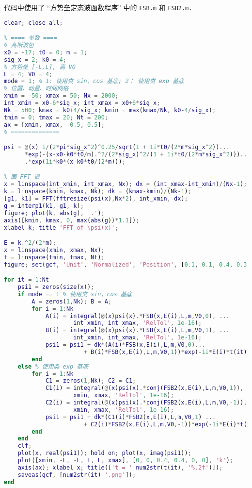 代码中使用了 “方势垒定态波函数程序” 中的 \verb|FSB.m| 和 \verb|FSB2.m|．
\begin{lstlisting}[language=matlab, caption=FSBsct.m]
% 方势垒散射高斯波包
clear; close all;

% ==== 参数 ====
% 高斯波包
x0 = -17; t0 = 0; m = 1;
sig_x = 2; k0 = 4;
% 方势垒 [-L,L], 高 V0
L = 4; V0 = 4;
mode = 1; % 1: 使用类 sin，cos 基底; 2： 使用类 exp 基底
% 位置、动量、时间网格
xmin = -50; xmax = 50; Nx = 2000;
int_xmin = x0-6*sig_x; int_xmax = x0+6*sig_x;
Nk = 500; kmax = k0+4/sig_x; kmin = max(kmax/Nk, k0-4/sig_x);
tmin = 0; tmax = 20; Nt = 200;
ax = [xmin, xmax, -0.5, 0.5];
% ==============

psi = @(x) 1/(2*pi*sig_x^2)^0.25/sqrt(1 + 1i*t0/(2*m*sig_x^2))...
      *exp(-(x-x0-k0*t0/m).^2/(2*sig_x)^2/(1 + 1i*t0/(2*m*sig_x^2)))...
      .*exp(1i*k0*(x-k0*t0/(2*m)));

% 画 FFT 谱
x = linspace(int_xmin, int_xmax, Nx); dx = (int_xmax-int_xmin)/(Nx-1);
k = linspace(kmin, kmax, Nk); dk = (kmax-kmin)/(Nk-1);
[g1, k1] = FFT(fftresize(psi(x),Nx*2), int_xmin, dx);
g = interp1(k1, g1, k);
figure; plot(k, abs(g), '.');
axis([kmin, kmax, 0, max(abs(g))*1.1]);
xlabel k; title 'FFT of \psi(x)';

E = k.^2/(2*m);
x = linspace(xmin, xmax, Nx);
t = linspace(tmin, tmax, Nt);
figure; set(gcf, 'Unit', 'Normalized', 'Position', [0.1, 0.1, 0.4, 0.3]);

for it = 1:Nt
    psi1 = zeros(size(x));
    if mode == 1 % 使用类 sin，cos 基底
        A = zeros(1,Nk); B = A;
        for i = 1:Nk
            A(i) = integral(@(x)psi(x).*FSB(x,E(i),L,m,V0,0), ...
                    int_xmin, int_xmax, 'RelTol', 1e-16);
            B(i) = integral(@(x)psi(x).*FSB(x,E(i),L,m,V0,1), ...
                    int_xmin, int_xmax, 'RelTol', 1e-16);
            psi1 = psi1 + dk*(A(i)*FSB(x,E(i),L,m,V0,0)...
                       + B(i)*FSB(x,E(i),L,m,V0,1))*exp(-1i*E(i)*t(it));
        end
    else % 使用类 exp 基底
        for i = 1:Nk
            C1 = zeros(1,Nk); C2 = C1;
            C1(i) = integral(@(x)psi(x).*conj(FSB2(x,E(i),L,m,V0,1)), ...
                    xmin, xmax, 'RelTol', 1e-16);
            C2(i) = integral(@(x)psi(x).*conj(FSB2(x,E(i),L,m,V0,-1)), ...
                    xmin, xmax, 'RelTol', 1e-16);
            psi1 = psi1 + dk*(C1(i)*FSB2(x,E(i),L,m,V0,1) ...
                       + C2(i)*FSB2(x,E(i),L,m,V0,-1))*exp(-1i*E(i)*t(it));
        end
    end
    clf;
    plot(x, real(psi1)); hold on; plot(x, imag(psi1));
    plot([xmin, -L, -L, L, L, xmax], [0, 0, 0.4, 0.4, 0, 0], 'k');
    axis(ax); xlabel x; title(['t = ' num2str(t(it), '%.2f')]);
    saveas(gcf, [num2str(it) '.png']);
end
\end{lstlisting}
